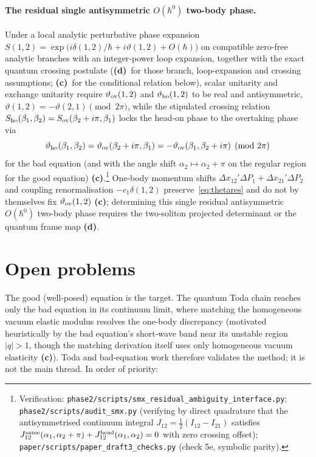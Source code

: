 \documentclass[11pt,a4paper]{article}
\newcommand{\lab}[1]{{\normalfont\sffamily\footnotesize\bfseries(#1)}}
\newcommand{\Lc}{\lab{c}}
\newcommand{\Ld}{\lab{d}}
\newcommand{\scr}[1]{\nolinkurl{#1}}
\newcommand{\chk}[1]{\footnote{\raggedright Verification: #1.}}
\newcommand{\hb}{\hbar}
\theoremstyle{remark}
\begin{document}
\paragraph{The residual single antisymmetric $O(\hb^0)$ two-body phase.} Under a local analytic perturbative phase expansion $S(1,2)=\exp\big(i\delta(1,2)/\hb+i\vartheta(1,2)+O(\hb)\big)$ on compatible zero-free analytic branches with an integer-power loop expansion, together with the exact quantum crossing postulate (\Ld\ for those branch, loop-expansion and crossing assumptions; \Lc\ for the conditional relation below), scalar unitarity and exchange unitarity require $\vartheta_{\rm ov}(1,2)$ and $\vartheta_{\rm ho}(1,2)$ to be real and antisymmetric, $\vartheta(1,2)=-\vartheta(2,1)\pmod{2\pi}$, while the stipulated crossing relation $S_{\rm ho}(\beta_1,\beta_2)=S_{\rm ov}(\beta_2+i\pi,\beta_1)$ locks the head-on phase to the overtaking phase via
\begin{equation}\label{eq:thetares}
\vartheta_{\rm ho}(\beta_1,\beta_2)=\vartheta_{\rm ov}(\beta_2+i\pi,\beta_1)=-\vartheta_{\rm ov}(\beta_1,\beta_2+i\pi)\pmod{2\pi}
\end{equation}
for the bad equation (and with the angle shift $\alpha_2\mapsto\alpha_2+\pi$ on the regular region for the good equation) \Lc.\chk{\scr{phase2/scripts/smx_residual_ambiguity_interface.py}; \scr{phase2/scripts/audit_smx.py} (verifying by direct quadrature that the antisymmetrised continuum integral $J_{12}=\tfrac12(I_{12}-I_{21})$ satisfies $J_{12}^{\rm same}(\alpha_1,\alpha_2+\pi)+J_{12}^{\rm head}(\alpha_1,\alpha_2)=0$ with zero crossing offset); \scr{paper/scripts/paper_draft3_checks.py} (check 5e, symbolic parity)}
One-body momentum shifts $\Delta x_{12}'\Delta P_1+\Delta x_{21}'\Delta P_2$ and coupling renormalisation $-c_1\delta(1,2)$ preserve~\eqref{eq:thetares} and do not by themselves fix $\vartheta_{\rm ov}(1,2)$ \Lc; determining this single residual antisymmetric $O(\hb^0)$ two-body phase requires the two-soliton projected determinant or the quantum frame map \Ld.

\section{Open problems}\label{sec:open}

The good (well-posed) equation is the target. The quantum Toda chain reaches only the bad equation in its continuum limit, where matching the homogeneous vacuum elastic modulus resolves the one-body discrepancy (motivated heuristically by the bad equation's short-wave band near its unstable region $|q|>1$, though the matching derivation itself uses only homogeneous vacuum elasticity \Lc). Toda and bad-equation work therefore validates the method; it is not the main thread. In order of priority:
\end{document}
